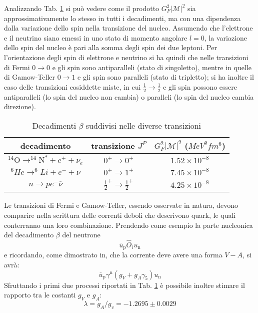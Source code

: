 \documentclass{subnucbo}
\begin{document}
Analizzando Tab. \ref{tab:beta_decays} si può vedere come il prodotto $G_{F}^{2}|\mathcal{M}|^{2}$ sia approssimativamente lo stesso in tutti i decadimenti, ma con una dipendenza dalla variazione dello spin nella transizione del nucleo. Assumendo che l'elettrone e il neutrino siano emessi in uno stato di momento angolare $l=0$, la variazione dello spin del nucleo è pari alla somma degli spin dei due leptoni. Per l'orientazione degli spin di elettrone e neutrino si ha quindi che nelle transizioni di Fermi $0 \rightarrow 0$ e gli spin sono antiparalleli (stato di singoletto), mentre in quelle di Gamow-Teller $0 \rightarrow 1$ e gli spin sono paralleli (stato di tripletto); si ha inoltre il caso delle transizioni cosiddette miste, in cui $\frac{1}{2} \rightarrow \frac{1}{2}$ e gli spin possono essere antiparalleli (lo spin del nucleo non cambia) o paralleli (lo spin del nucleo cambia direzione).
\begin{table}
        \centering
        \begin{tabular}{c  c  c}
                \hline
                decadimento & transizione $J^{P}$ & $G _ { F } ^ { 2 } | \mathcal { M } | ^ { 2 }$ ($MeV^{2}fm^{6}$) \\
                \hline
                $^ { 14 } \mathrm { O } \rightarrow ^ { 14 } \mathrm { N } ^ { * } + e ^ { + } + \nu _ { e }$ & $0 ^ { + } \rightarrow 0 ^ { + }$ & $1.52 \times 10 ^ { - 8 }$ \\
                $^{6}H e \rightarrow^ { 6 } L i + e ^ { - } + \overline { \nu }$ & $0^{+} \rightarrow 1^{+}$ & $7.45 \times 10 ^ { - 8 }$ \\
                $n \rightarrow p e ^ { - } \overline { \nu }$ & $\frac { 1 } { 2 }^{+} \rightarrow \frac { 1 } { 2 } ^ { + }$ & $4.25 \times 10 ^ { - 8 }$ \\
                \hline
        \end{tabular}
        \caption{Decadimenti $\beta$ suddivisi nelle diverse transizioni}
        \label{tab:beta_decays}
\end{table}
Le transizioni di Fermi e Gamow-Teller, essendo osservate in natura, devono comparire nella scrittura delle correnti deboli che descrivono quark, le quali conterranno una loro combinazione. Prendendo come esempio la parte nucleonica del decadimento $\beta$ del neutrone
\begin{equation}
        \overline { u } _ { \mathrm { p } } \hat { O } _ { i } u _ { \mathrm { n } }
\end{equation}
e ricordando, come dimostrato in, che la corrente deve avere una forma $V-A$, si avrà:
\begin{equation}
        \overline { u } _ { \mathrm { p } } \gamma ^ { \mu } \left( g _ { V } + g _ { A } \gamma _ { 5 } \right) u _ { \mathrm { n } }
        \label{eq:barionic_current}
\end{equation}
Sfruttando i primi due processi riportati in Tab. \ref{tab:beta_decays} è possibile inoltre stimare \cite{ref:BGSex} il rapporto tra le costanti $g_{V}$ e $g_{A}$:
\begin{equation}
        \lambda = g _ { A } / g _ { v } = - 1.2695 \pm 0.0029
        \label{eq:ga_gv}
\end{equation}
\end{document}
